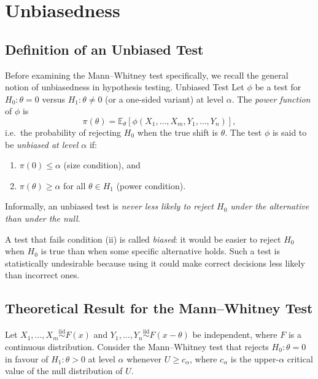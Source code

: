 \documentclass[10pt]{article}
\begin{document}
\section{Unbiasedness}
\subsection{Definition of an Unbiased Test}

Before examining the Mann--Whitney test specifically, we recall the
general notion of unbiasedness in hypothesis testing.
Unbiased Test
Let $\phi$ be a test for $H_0 : \theta = 0$ versus
$H_1 : \theta \neq 0$ (or a one-sided variant) at level $\alpha$.
The \emph{power function} of $\phi$ is
\[
  \pi(\theta) = \mathbb{E}_\theta[\phi(X_1,\ldots,X_m,
                                       Y_1,\ldots,Y_n)],
\]
i.e.\ the probability of rejecting $H_0$ when the true shift is
$\theta$. The test $\phi$ is said to be \emph{unbiased at level
$\alpha$} if:
\begin{enumerate}
  \item $\pi(0) \leq \alpha$ \quad (size condition), and
  \item $\pi(\theta) \geq \alpha$ for all $\theta \in H_1$
        \quad (power condition).
\end{enumerate}
Informally, an unbiased test is \emph{never less likely to reject
$H_0$ under the alternative than under the null}.

A test that fails condition (ii) is called \emph{biased}: it
would be easier to reject $H_0$ when $H_0$ is true than when
some specific alternative holds. Such a test is statistically
undesirable because using it could make correct decisions less
likely than incorrect ones.

\subsection{Theoretical Result for the Mann--Whitney Test}

\label{thm:unbiasedness}
Let $X_1,\ldots,X_m \overset{\text{iid}}{\sim} F(x)$ and
$Y_1,\ldots,Y_n \overset{\text{iid}}{\sim} F(x - \theta)$
be independent, where $F$ is a continuous distribution.
Consider the Mann--Whitney test that rejects $H_0 : \theta = 0$ in
favour of $H_1 : \theta > 0$ at level $\alpha$ whenever
$U \geq c_\alpha$, where $c_\alpha$ is the upper-$\alpha$ critical
value of the null distribution of $U$.
\end{document}
